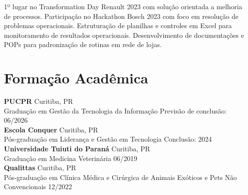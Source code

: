 \documentclass[11pt,a4paper]{article}
\begin{document}
1º lugar no Transformation Day Renault 2023 com solução orientada a melhoria de processos. Participação no Hackathon Bosch 2023 com foco em resolução de problemas operacionais. Estruturação de planilhas e controles em Excel para monitoramento de resultados operacionais. Desenvolvimento de documentações e POPs para padronização de rotinas em rede de lojas.

\section{Formação Acadêmica}

\textbf{PUCPR} \hfill Curitiba, PR\\
Graduação em Gestão da Tecnologia da Informação \hfill Previsão de conclusão: 06/2026\\[6pt]

\textbf{Escola Conquer} \hfill Curitiba, PR\\
Pós-graduação em Liderança e Gestão em Tecnologia \hfill Conclusão: 2024\\[6pt]

\textbf{Universidade Tuiuti do Paraná} \hfill Curitiba, PR\\
Graduação em Medicina Veterinária \hfill 06/2019\\[6pt]

\textbf{Qualittas} \hfill Curitiba, PR\\
Pós-graduação em Clínica Médica e Cirúrgica de Animais Exóticos e Pets Não Convencionais \hfill 12/2022
\end{document}
